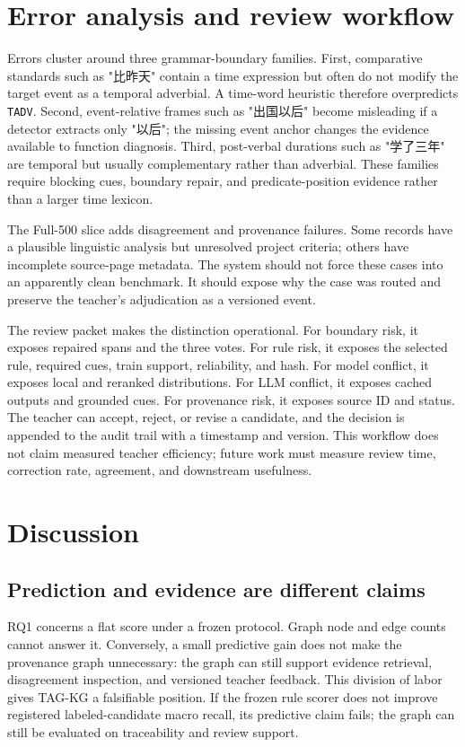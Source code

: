 \documentclass{CUP-JNL-NLP}
\begin{document}
\section{Error analysis and review workflow}
Errors cluster around three grammar-boundary families. First, comparative standards such as "比昨天" contain a time expression but often do not modify the target event as a temporal adverbial. A time-word heuristic therefore overpredicts \texttt{TADV}. Second, event-relative frames such as "出国以后" become misleading if a detector extracts only "以后"; the missing event anchor changes the evidence available to function diagnosis. Third, post-verbal durations such as "学了三年" are temporal but usually complementary rather than adverbial. These families require blocking cues, boundary repair, and predicate-position evidence rather than a larger time lexicon.

The Full-500 slice adds disagreement and provenance failures. Some records have a plausible linguistic analysis but unresolved project criteria; others have incomplete source-page metadata. The system should not force these cases into an apparently clean benchmark. It should expose why the case was routed and preserve the teacher's adjudication as a versioned event.

The review packet makes the distinction operational. For boundary risk, it exposes repaired spans and the three votes. For rule risk, it exposes the selected rule, required cues, train support, reliability, and hash. For model conflict, it exposes local and reranked distributions. For LLM conflict, it exposes cached outputs and grounded cues. For provenance risk, it exposes source ID and status. The teacher can accept, reject, or revise a candidate, and the decision is appended to the audit trail with a timestamp and version. This workflow does not claim measured teacher efficiency; future work must measure review time, correction rate, agreement, and downstream usefulness.

\section{Discussion}
\subsection{Prediction and evidence are different claims}
RQ1 concerns a flat score under a frozen protocol. Graph node and edge counts cannot answer it. Conversely, a small predictive gain does not make the provenance graph unnecessary: the graph can still support evidence retrieval, disagreement inspection, and versioned teacher feedback. This division of labor gives TAG-KG a falsifiable position. If the frozen rule scorer does not improve registered labeled-candidate macro recall, its predictive claim fails; the graph can still be evaluated on traceability and review support.
\end{document}
